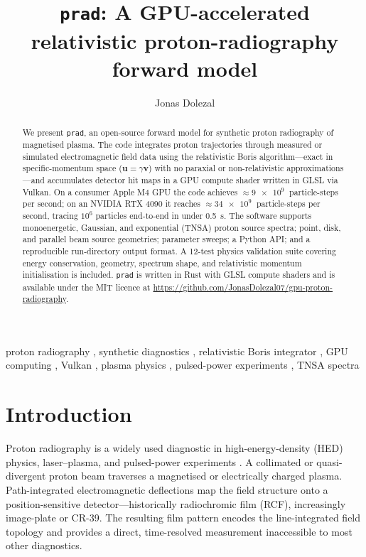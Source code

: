 \documentclass[review,12pt]{elsarticle}
\begin{document}
\begin{frontmatter}

\title{\texttt{prad}: A GPU-accelerated relativistic proton-radiography forward model}

\author[inst1]{Jonas Dolezal}
\address[inst1]{[Institution]}

\begin{abstract}
We present  \texttt{prad}, an open-source forward model for synthetic proton radiography
of magnetised plasma. The code integrates proton trajectories through measured or simulated
electromagnetic field data using the relativistic Boris algorithm—exact in
specific-momentum space ($\mathbf{u} = \gamma\mathbf{v}$) with no paraxial or
non-relativistic approximations—and accumulates detector hit maps in a GPU compute
shader written in GLSL via Vulkan. On a consumer Apple M4 GPU the code achieves
$\approx\SI{9e9}{}$ particle-steps per second; on an NVIDIA RTX 4090 it reaches
$\approx\SI{34e9}{}$ particle-steps per second, tracing $10^6$ particles end-to-end in
under \SI{0.5}{\second}. The software supports monoenergetic, Gaussian, and
exponential (TNSA) proton source spectra; point, disk, and parallel beam source
geometries; parameter sweeps; a Python API; and a reproducible run-directory output
format. A 12-test physics validation suite covering energy conservation, geometry,
spectrum shape, and relativistic momentum initialisation is included. \texttt{prad}
is written in Rust with GLSL compute shaders and is available under the MIT licence at
\url{https://github.com/JonasDolezal07/gpu-proton-radiography}.
\end{abstract}

\begin{keyword}
proton radiography \sep
synthetic diagnostics \sep
relativistic Boris integrator \sep
GPU computing \sep
Vulkan \sep
plasma physics \sep
pulsed-power experiments \sep
TNSA spectra
\end{keyword}

\end{frontmatter}

\section{Introduction}
\label{sec:intro}

Proton radiography is a widely used diagnostic in high-energy-density (HED) physics,
laser–plasma, and pulsed-power experiments \cite{mackinnon2006,gao2016,gao2022}.
A collimated or quasi-divergent proton beam traverses a magnetised or electrically charged
plasma. Path-integrated electromagnetic deflections map the field structure onto a position-sensitive
detector—historically radiochromic film (RCF), increasingly image-plate or CR-39.
The resulting film pattern encodes the line-integrated field topology and provides a
direct, time-resolved measurement inaccessible to most other diagnostics.
\end{document}
